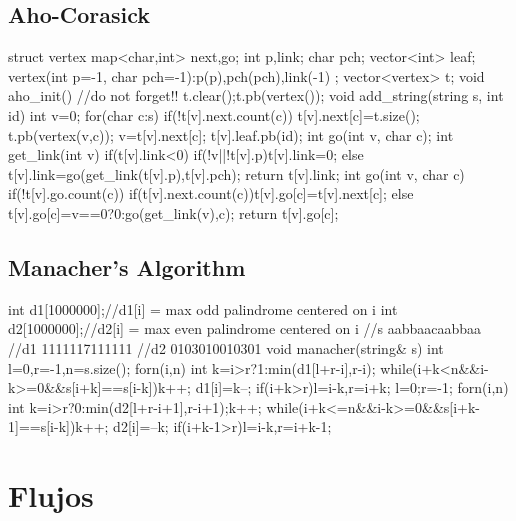 \documentclass[10pt, landscape, twocolumn, a4paper, notitlepage]{article}
\begin{document}
\subsection{Aho-Corasick}
\begin{code}
struct vertex {
    map<char,int> next,go;
    int p,link;
    char pch;
    vector<int> leaf;
    vertex(int p=-1, char pch=-1):p(p),pch(pch),link(-1){}
};
vector<vertex> t;
void aho_init(){ //do not forget!!
    t.clear();t.pb(vertex());
}
void add_string(string s, int id){
    int v=0;
    for(char c:s){
        if(!t[v].next.count(c)){
            t[v].next[c]=t.size();
            t.pb(vertex(v,c));
        }
        v=t[v].next[c];
    }
    t[v].leaf.pb(id);
}
int go(int v, char c);
int get_link(int v){
    if(t[v].link<0)
        if(!v||!t[v].p)t[v].link=0;
        else t[v].link=go(get_link(t[v].p),t[v].pch);
    return t[v].link;
}
int go(int v, char c){
    if(!t[v].go.count(c))
        if(t[v].next.count(c))t[v].go[c]=t[v].next[c];
        else t[v].go[c]=v==0?0:go(get_link(v),c);
    return t[v].go[c];
}
\end{code}
\subsection{Manacher's Algorithm}
\begin{code}
int d1[1000000];//d1[i] = max odd palindrome centered on i
int d2[1000000];//d2[i] = max even palindrome centered on i
//s  aabbaacaabbaa
//d1 1111117111111
//d2 0103010010301
void manacher(string& s){
    int l=0,r=-1,n=s.size();
    forn(i,n){
        int k=i>r?1:min(d1[l+r-i],r-i);
        while(i+k<n&&i-k>=0&&s[i+k]==s[i-k])k++;
        d1[i]=k--;
        if(i+k>r)l=i-k,r=i+k;
    }
    l=0;r=-1;
    forn(i,n){
        int k=i>r?0:min(d2[l+r-i+1],r-i+1);k++;
        while(i+k<=n&&i-k>=0&&s[i+k-1]==s[i-k])k++;
        d2[i]=--k;
        if(i+k-1>r)l=i-k,r=i+k-1;
    }
}
\end{code}
\section{Flujos}
\end{document}
